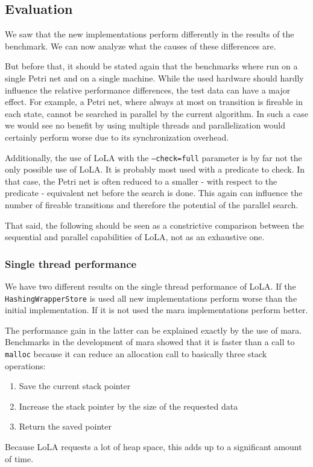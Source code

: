 \subsection{Evaluation}
\label{evaluation}
We saw that the new implementations perform differently in the results of the benchmark. We can now analyze what the causes of these differences are.

But before that, it should be stated again that the benchmarks where run on a single Petri net and on a single machine. While the used hardware should hardly influence the relative performance differences, the test data can have a major effect. For example, a Petri net, where always at most on transition is fireable in each state, cannot be searched in parallel by the current algorithm. In such a case we would see no benefit by using multiple threads and parallelization would certainly perform worse due to its synchronization overhead.

Additionally, the use of LoLA with the \texttt{--check=full} parameter is by far not the only possible use of LoLA. It is probably most used with a predicate to check. In that case, the Petri net is often reduced to a smaller - with respect to the predicate - equivalent net before the search is done. This again can influence the number of fireable transitions and therefore the potential of the parallel search.

That said, the following should be seen as a constrictive comparison between the sequential and parallel capabilities of LoLA, not as an exhaustive one.

\subsubsection{Single thread performance}
\label{evalSingleThread}
We have two different results on the single thread performance of LoLA. If the \texttt{Hashing\-Wrapper\-Store} is used all new implementations perform worse than the initial implementation. If it is not used the mara implementations perform better.

The performance gain in the latter can be explained exactly by the use of mara. Benchmarks in the development of mara showed that it is faster than a call to \texttt{malloc} because it can reduce an allocation call to basically three stack operations:
\begin{enumerate}
    \item Save the current stack pointer
    \item Increase the stack pointer by the size of the requested data
    \item Return the saved pointer
\end{enumerate}
Because LoLA requests a lot of heap space, this adds up to a significant amount of time.

